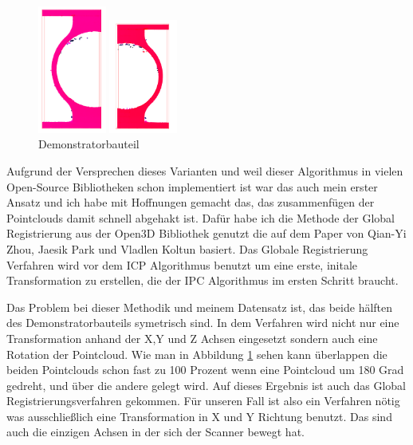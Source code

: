 \documentclass[../main.tex]{subfiles}
\begin{document}
\begin{figure}
    \centering
    \includegraphics[width=0.2\textwidth]{images/demonstratorbauteil_top.PNG}
    \smallskip\par
    \includegraphics[width=0.2\textwidth]{images/demonstratorbauteil_bottom.PNG}
    \caption{Demonstratorbauteil}
    \label{fig:demonstratorbauteil}
    \vspace{-20pt}
\end{figure}

Aufgrund der Versprechen dieses Varianten und weil dieser Algorithmus in vielen
Open-Source Bibliotheken schon implementiert ist war das auch mein erster Ansatz
und ich habe mit Hoffnungen gemacht das, das zusammenfügen der Pointclouds 
damit schnell abgehakt ist. 
Dafür habe ich die Methode der Global Registrierung aus der Open3D Bibliothek genutzt
die auf dem Paper von Qian-Yi Zhou, Jaesik Park und Vladlen Koltun basiert. \cite{Zhou.}
Das Globale Registrierung Verfahren wird vor dem ICP Algorithmus benutzt um eine erste, 
initale Transformation zu erstellen, die der IPC Algorithmus im ersten Schritt braucht.

Das Problem bei dieser Methodik und meinem Datensatz ist, das beide hälften des
Demonstratorbauteils symetrisch sind. In dem Verfahren wird nicht nur eine Transformation
anhand der X,Y und Z Achsen eingesetzt sondern auch eine Rotation der Pointcloud.
Wie man in Abbildung \ref{fig:demonstratorbauteil} sehen kann überlappen die beiden Pointclouds 
schon fast zu 100 Prozent wenn eine Pointcloud um 180 Grad gedreht, und über die andere
gelegt wird. Auf dieses Ergebnis ist auch das Global Registrierungsverfahren gekommen. 
Für unseren Fall ist also ein Verfahren nötig was ausschließlich eine 
Transformation in X und Y Richtung benutzt. Das sind auch die einzigen Achsen in 
der sich der Scanner bewegt hat.
\end{document}
